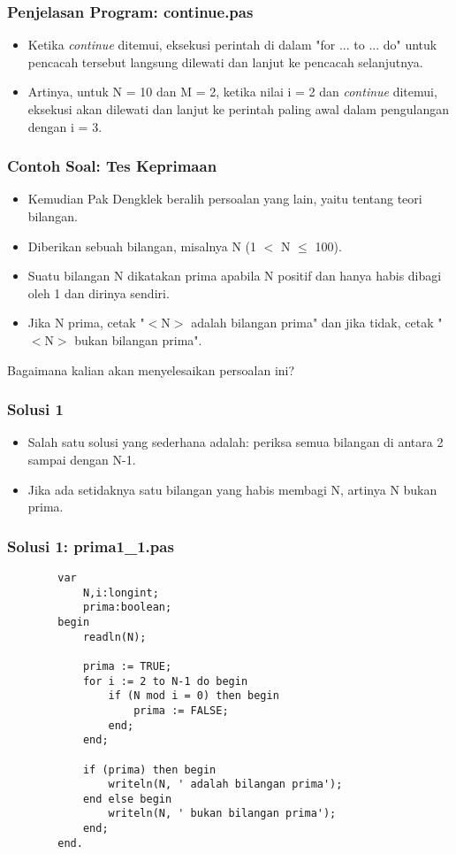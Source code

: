 \documentclass{beamer}
\begin{document}
\begin{frame}
\frametitle{Penjelasan Program: continue.pas}
\begin{itemize}
	\item Ketika \textit{continue} ditemui, eksekusi perintah di dalam "for ... to ... do" untuk pencacah tersebut langsung dilewati dan lanjut ke pencacah selanjutnya.
	\item Artinya, untuk N = 10 dan M = 2, ketika nilai i = 2 dan \textit{continue} ditemui, eksekusi akan dilewati dan lanjut ke perintah paling awal dalam pengulangan dengan i = 3. 
\end{itemize}
\end{frame}


\begin{frame}
\frametitle{Contoh Soal: Tes Keprimaan}
\begin{itemize}
	\item Kemudian Pak Dengklek beralih persoalan yang lain, yaitu tentang teori bilangan.
	\item Diberikan sebuah bilangan, misalnya N (1 $<$ N $\leq$ 100).
	\item Suatu bilangan N dikatakan prima apabila N positif dan hanya habis dibagi oleh 1 dan dirinya sendiri.
	\item Jika N prima, cetak "$<$N$>$ adalah bilangan prima" dan jika tidak, cetak "$<$N$>$ bukan bilangan prima".
\end{itemize}
Bagaimana kalian akan menyelesaikan persoalan ini?
\end{frame}

\begin{frame}
\frametitle{Solusi 1}
\begin{itemize}
	\item Salah satu solusi yang sederhana adalah: periksa semua bilangan di antara 2 sampai dengan N-1.
	\item Jika ada setidaknya satu bilangan yang habis membagi N, artinya N bukan prima.
\end{itemize}
\end{frame}


\begin{frame}[fragile]
\frametitle{Solusi 1: prima1\_1.pas}
	\begin{lstlisting}
		var
		    N,i:longint;
		    prima:boolean;
		begin
		    readln(N);
		
		    prima := TRUE;
		    for i := 2 to N-1 do begin
		        if (N mod i = 0) then begin
		            prima := FALSE;
		        end;
		    end;
		
		    if (prima) then begin
		        writeln(N, ' adalah bilangan prima');
		    end else begin
		        writeln(N, ' bukan bilangan prima');
		    end;
		end.
	\end{lstlisting}
\end{frame}
\end{document}

